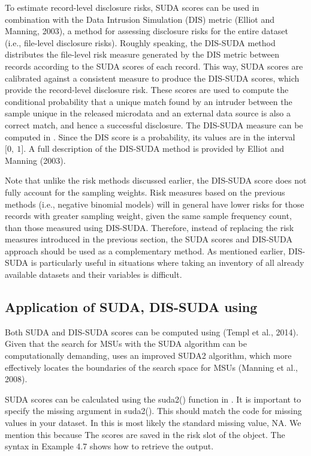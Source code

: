 \documentclass[letterpaper,10pt,english]{sphinxmanual}
\begin{document}
To estimate record-level disclosure risks, SUDA scores can be used in
combination with the Data Intrusion Simulation (DIS) metric (Elliot and
Manning, 2003), a method for assessing disclosure risks for the entire
dataset (i.e., file-level disclosure risks). Roughly speaking, the
DIS-SUDA method distributes the file-level risk measure generated by the
DIS metric between records according to the SUDA scores of each record.
This way, SUDA scores are calibrated against a consistent measure to
produce the DIS-SUDA scores, which provide the record-level disclosure
risk. These scores are used to compute the conditional probability that
a unique match found by an intruder between the sample unique in the
released microdata and an external data source is also a correct match,
and hence a successful disclosure. The DIS-SUDA measure can be computed
in . Since the DIS score is a probability, its values are in
the interval \(\lbrack 0,\ 1\rbrack\). A full description of the
DIS-SUDA method is provided by Elliot and Manning (2003).

Note that unlike the risk methods discussed earlier, the DIS-SUDA score
does not fully account for the sampling weights. Risk measures based on
the previous methods (i.e., negative binomial models) will in general
have lower risks for those records with greater sampling weight, given
the same sample frequency count, than those measured using DIS-SUDA.
Therefore, instead of replacing the risk measures introduced in the
previous section, the SUDA scores and DIS-SUDA approach should be used
as a complementary method. As mentioned earlier, DIS-SUDA is
particularly useful in situations where taking an inventory of all
already available datasets and their variables is difficult.


\subsection{Application of SUDA, DIS-SUDA using }
\label{\detokenize{measure_risk:application-of-suda-dis-suda-using-sdcmicro}}
Both SUDA and DIS-SUDA scores can be computed using  (Templ et
al., 2014). Given that the search for MSUs with the SUDA algorithm can
be computationally demanding,  uses an improved SUDA2
algorithm, which more effectively locates the boundaries of the search
space for MSUs (Manning et al., 2008).

SUDA scores can be calculated using the suda2() function in .
It is important to specify the missing argument in suda2(). This should
match the code for missing values in your dataset. In  this is most
likely the  standard missing value, NA. We mention this because  The scores are saved in the risk slot of the 
object. The syntax in Example 4.7 shows how to retrieve the output.
\end{document}
